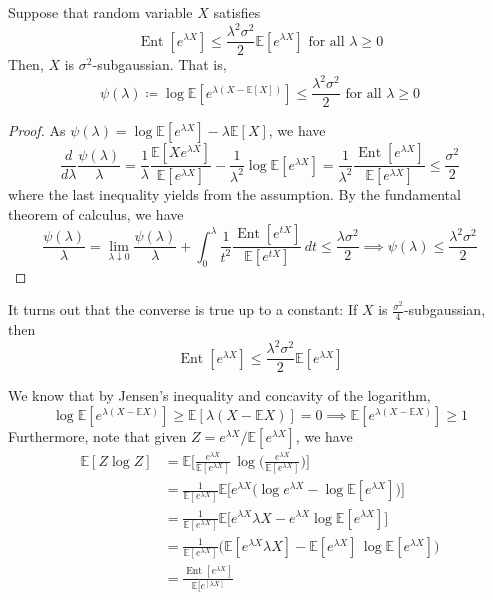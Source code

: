 \documentclass{article}
\DeclareMathOperator{\Ent}{Ent}
\begin{document}
  \begin{lemma}[Herbst]
  Suppose that random variable $X$ satisfies
  \[\Ent[e^{\lambda X}] \leq \frac{\lambda^2 \sigma^2}{2} \mathbb{E}[e^{\lambda X}]  \text{ for all } \lambda \geq 0\]
  Then, $X$ is $\sigma^2$-subgaussian. That is, 
  \[\psi(\lambda) \coloneqq \log\mathbb{E}[e^{\lambda (X - \mathbb{E}[X])}] \leq \frac{\lambda^2 \sigma^2}{2} \text{ for all } \lambda \geq 0\]
  \end{lemma}
  \begin{proof}
  As $\psi(\lambda) = \log\mathbb{E}[ e^{\lambda X}] - \lambda \mathbb{E}[X]$, we have 
  \[\frac{d}{d \lambda} \frac{\psi(\lambda)}{\lambda} = \frac{1}{\lambda} \frac{\mathbb{E}[X e^{\lambda X}]}{\mathbb{E}[e^{\lambda X}]} - \frac{1}{\lambda^2} \log \mathbb{E}[e^{\lambda X}] = \frac{1}{\lambda^2} \frac{\Ent [e^{\lambda X}]}{\mathbb{E}[e^{\lambda X}]} \leq \frac{\sigma^2}{2}\]
  where the last inequality yields from the assumption. By the fundamental theorem of calculus, we have 
  \[\frac{\psi (\lambda)}{\lambda} = \lim_{\lambda \downarrow 0} \frac{\psi(\lambda)}{\lambda} + \int_0^\lambda \frac{1}{t^2} \frac{\Ent[e^{t X}]}{\mathbb{E}[e^{t X}]} \,dt \leq \frac{\lambda \sigma^2}{2} \implies \psi(\lambda) \leq \frac{\lambda^2 \sigma^2}{2}\]
  \end{proof}

  \begin{exercise}
  It turns out that the converse is true up to a constant: If $X$ is $\frac{\sigma^2}{4}$-subgaussian, then 
  \[\Ent [e^{\lambda X}] \leq \frac{\lambda^2 \sigma^2}{2} \mathbb{E}[e^{\lambda X}]\]
  \end{exercise}
  \begin{solution}
  We know that by Jensen's inequality and concavity of the logarithm, 
  \[\log \mathbb{E}[e^{\lambda(X - \mathbb{E} X)}] \geq \mathbb{E}[\lambda (X - \mathbb{E} X)] = 0 \implies \mathbb{E}[e^{\lambda(X - \mathbb{E} X)}] \geq 1\]
  Furthermore, note that given $Z = e^{\lambda X} / \mathbb{E}[e^{\lambda X}]$, we have 
  \begin{align*}
      \mathbb{E}[Z \log{Z}] & = \mathbb{E} \bigg[ \frac{e^{\lambda X}}{\mathbb{E}[e^{\lambda X}]} \, \log \bigg( \frac{e^{\lambda X}}{\mathbb{E}[e^{\lambda X}]} \bigg) \bigg] \\
      & = \frac{1}{\mathbb{E}[e^{\lambda X}]} \mathbb{E}\big[ e^{\lambda X} \big( \log e^{\lambda X} - \log \mathbb{E}[e^{\lambda X}] \big) \big] \\
      & = \frac{1}{\mathbb{E}[e^{\lambda X}]} \mathbb{E} \big[ e^{\lambda X} \lambda X - e^{\lambda X} \log \mathbb{E}[e^{\lambda X}] \big] \\
      & = \frac{1}{\mathbb{E}[e^{\lambda X}]} \Big( \mathbb{E} [ e^{\lambda X} \lambda X ] - \mathbb{E}[ e^{\lambda X}] \, \log \mathbb{E}[e^{\lambda X}] \Big) \\
      & = \frac{\Ent [e^{\lambda X}]}{\mathbb{E}[e^[{\lambda X}]} 
  \end{align*}

  \end{solution}
\end{document}
